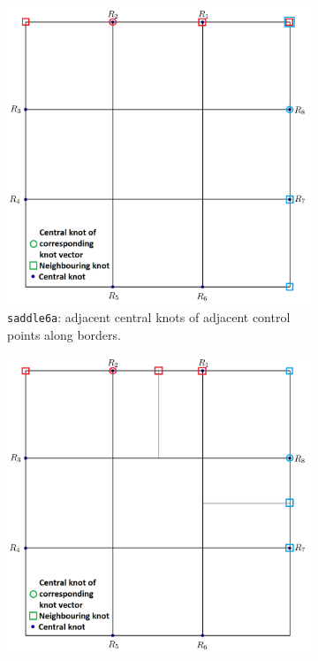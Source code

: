 \documentclass{article}
\begin{document}
\begin{figure}[H]
\centering
\begin{subfigure}[b]{0.32\textwidth}
\includegraphics[width=\textwidth]{saddle6aparam}
\caption{\texttt{saddle6a}: adjacent central knots of adjacent control points along borders.}
\label{saddle6ap}
\end{subfigure}
\begin{subfigure}[b]{0.32\textwidth}
\includegraphics[width=\textwidth]{saddle6bparam}

\end{subfigure}
\end{figure}
\end{document}
